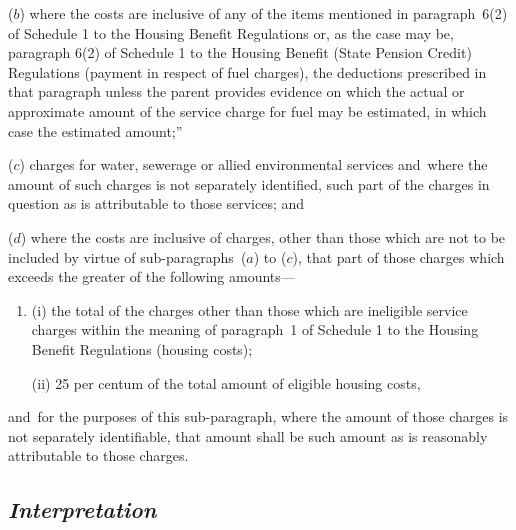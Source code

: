 \documentclass[12pt,a4paper]{article}
\begin{document}
\begin{enumerate}
($b$) where the costs are inclusive of any of the items mentioned in paragraph~6(2) of Schedule 1 to the Housing Benefit Regulations or, as the case may be, paragraph 6(2) of Schedule 1 to the Housing Benefit (State Pension Credit) Regulations (payment in respect of fuel charges), the deductions prescribed in that paragraph unless the parent provides evidence on which the actual or approximate amount of the service charge for fuel may be estimated, in which case the estimated amount;”

($c$) charges for water, sewerage or allied environmental services and~where the amount of such charges is not separately identified, such part of the charges in question as is attributable to those services;
and

($d$) where the costs are inclusive of charges, other than those which are not to be included by virtue of sub-paragraphs~($a$) to ($c$), that part of those charges which exceeds the greater of the following amounts—
\begin{enumerate}\item[]
(i) the total of the charges other than those which are ineligible service charges within the meaning of paragraph~1 of Schedule 1 to the Housing Benefit Regulations (housing costs);

(ii) 25 per centum of the total amount of eligible housing costs,
\end{enumerate}
and~for the purposes of this sub-paragraph, where the amount of those charges is not separately identifiable, that amount shall be such amount as is reasonably attributable to those charges.
\end{enumerate}


\subsection*{\itshape Interpretation}
\end{document}
